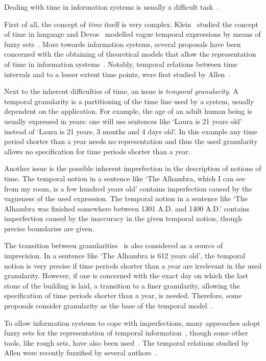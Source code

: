 Dealing with time in information systems is usually a difficult task~\cite{Bolour82}.

First of all, the concept of \emph{time} itself is very complex. Klein~\cite{klein94} studied the concept of time in language and Devos~\cite{devos94} modelled vague temporal expressions by means of fuzzy sets~\cite{zadeh65}. More towards information systems, several proposals have been concerned with the obtaining of theoretical models that allow the representation of time in information systems~\cite{devos98,Cru97}. Notably, temporal relations between time intervals and to a lesser extent time points, were first studied by Allen~\cite{Allen83}.

Next to the inherent difficulties of time, an issue is \emph{temporal granularity}. A temporal granularity is a partitioning of the time line used by a system, usually dependent on the application. For example, the age of an adult human being is usually expressed in years: one will use sentences like `Laura is 21 years old' instead of `Laura is 21 years, 3 months and 4 days old'. In this example any time period shorter than a year needs no representation and thus the used granularity allows no specification for time periods shorter than a year.

Another issue is the possible inherent imperfection in the description of notions of time. The temporal notion in a sentence like `The Alhambra, which I can see from my room, is a few hundred years old' contains imperfection caused by the vagueness of the used expression. The temporal notion in a sentence like `The Alhambra was finished somewhere between 1301 A.D. and 1400 A.D.' contains imperfection caused by the inaccuracy in the given temporal notion, though precise boundaries are given.

The transition between granularities~\cite{Lin97} is also considered as a source of imprecision. In a sentence like `The Alhambra is 612 years old', the temporal notion is very precise if time periods shorter than a year are irrelevant in the used granularity. However, if one is concerned with the exact day on which the last stone of the building is laid, a transition to a finer granularity, allowing the specification of time periods shorter than a year, is needed. Therefore, some proposals consider granularity as the base of the temporal model~\cite{Cru97}.

To allow information systems to cope with imperfections, many approaches adopt fuzzy sets for the representation of temporal information~\cite{343607,nagypal03,Dubois:jucs_9_9:fuzziness_and_uncertainty_in}, though some other tools, like rough sets, have also been used~\cite{Qia09}. The temporal relations studied by Allen were recently fuzzified by several authors~\cite{ohlbach04,nagypal03,schockaert08}.


